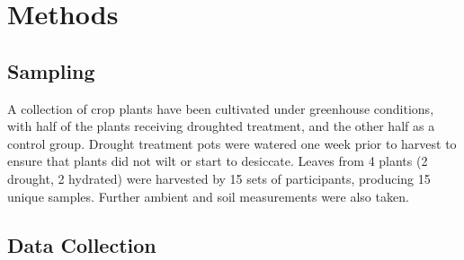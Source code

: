 \documentclass{report}
\begin{document}
\clearpage

\section{Methods}


\subsection{Sampling}

\hspace{24pt}A collection of crop plants have been cultivated under greenhouse conditions, with half of the plants receiving droughted treatment, and the other half as a control group. Drought treatment pots were watered one week prior to harvest to ensure that plants did not wilt or start to desiccate. Leaves from 4 plants (2 drought, 2 hydrated) were harvested by 15 sets of participants, producing 15 unique samples. Further ambient and soil measurements were also taken.




\subsection{Data Collection}
\end{document}
